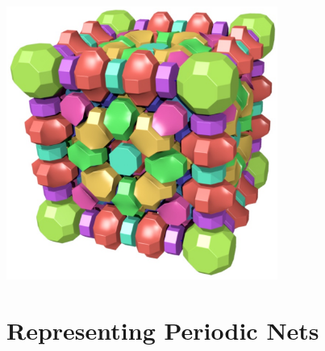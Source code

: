 \documentclass{beamer}
\begin{document}
\begin{frame}
  \begin{center}
    \includegraphics[width=3.5in]{PAU-3dt}
  \end{center}
\end{frame}


\section{Representing Periodic Nets}
\end{document}

